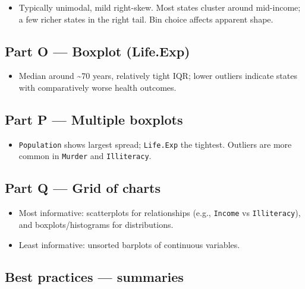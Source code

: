 \documentclass[
  letterpaper,
  DIV=11,
  numbers=noendperiod]{scrreprt}
\providecommand{\tightlist}{%
  \setlength{\itemsep}{0pt}\setlength{\parskip}{0pt}}
\begin{document}
\begin{itemize}
\tightlist
\item
  Typically unimodal, mild right-skew. Most states cluster around
  mid-income; a few richer states in the right tail. Bin choice affects
  apparent shape.
\end{itemize}

\subsection{Part O --- Boxplot
(Life.Exp)}\label{part-o-boxplot-life.exp}

\begin{itemize}
\tightlist
\item
  Median around \textasciitilde70 years, relatively tight IQR; lower
  outliers indicate states with comparatively worse health outcomes.
\end{itemize}

\subsection{Part P --- Multiple
boxplots}\label{part-p-multiple-boxplots-1}

\begin{itemize}
\tightlist
\item
  \texttt{Population} shows largest spread; \texttt{Life.Exp} the
  tightest. Outliers are more common in \texttt{Murder} and
  \texttt{Illiteracy}.
\end{itemize}

\subsection{Part Q --- Grid of charts}\label{part-q-grid-of-charts-1}

\begin{itemize}
\tightlist
\item
  Most informative: scatterplots for relationships (e.g.,
  \texttt{Income} vs \texttt{Illiteracy}), and boxplots/histograms for
  distributions.\\
\item
  Least informative: unsorted barplots of continuous variables.
\end{itemize}

\subsection{Best practices ---
summaries}\label{best-practices-summaries}
\end{document}
